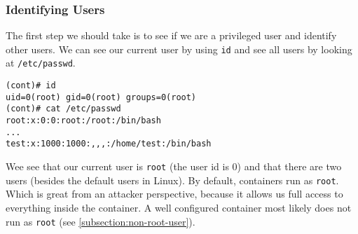 \subsubsection{Identifying Users}
The first step we should take is to see if we are a privileged user and identify other users. We can see our current user by using \lstinline{id} and see all users by looking at \lstinline{/etc/passwd}.
\begin{lstlisting}
(cont)# id
uid=0(root) gid=0(root) groups=0(root)
(cont)# cat /etc/passwd
root:x:0:0:root:/root:/bin/bash
...
test:x:1000:1000:,,,:/home/test:/bin/bash
\end{lstlisting}

Wee see that our current user is \lstinline{root} (the user id is 0) and that there are two users (besides the default users in Linux). By default, containers run as \lstinline{root}. Which is great from an attacker perspective, because it allows us full access to everything inside the container. A well configured container most likely does not run as \lstinline{root} (see \autoref{subsection:non-root-user}).
